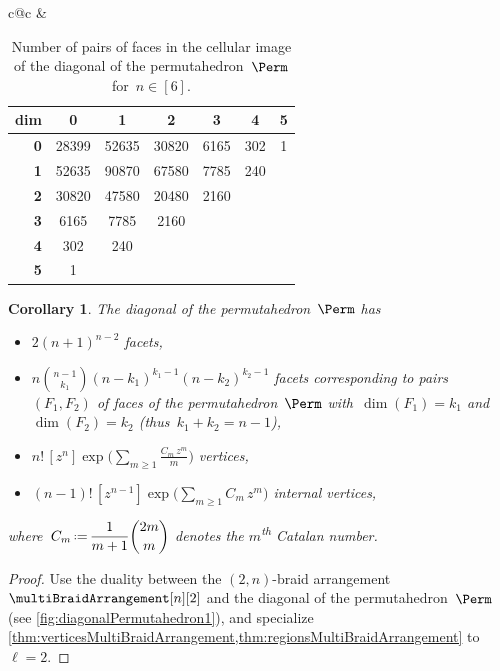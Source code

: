 \documentclass{amsart}
\newtheorem{corollary}[theorem]{Corollary}
\theoremstyle{definition}
\newcommand{\eqdef}{\mbox{\,\raisebox{0.2ex}{\scriptsize\ensuremath{\mathrm:}}\ensuremath{=}\,}} %
\newcommand{\ordinal}{\textsuperscript{th}} %
\begin{document}
\begin{table}
{\begin{tabular}{c@{\quad}c}
			&
			\begin{tabular}[t]{r|cccccc}
				\textbf{dim} & \textbf{0} & \textbf{1} & \textbf{2} & \textbf{3} & \textbf{4} & \textbf{5} \\
				\hline
				\textbf{0} & 28399 & 52635 & 30820 & 6165 & 302 & 1 \\
				\textbf{1} & 52635 & 90870 & 67580 & 7785 & 240 & \\
				\textbf{2} & 30820 & 47580 & 20480 & 2160 & & \\
				\textbf{3} & 6165 & 7785 & 2160 & && \\
				\textbf{4} & 302 & 240 & & &&\\
				\textbf{5} & 1 & & & &&
			\end{tabular}
		\end{tabular}
	}
	\caption{Number of pairs of faces in the cellular image of the diagonal of the permutahedron~$\Perm$ for~$n \in [6]$.}
	\label{table:enumerationDiagonalPermutahedra2}
\end{table}

\begin{corollary}
\label{coro:enumerationDiagonalPermutahedra}
The diagonal of the permutahedron~$\Perm$ has 
\begin{itemize}
\item $2 (n + 1)^{n-2}$ facets,
\item $n \binom{n-1}{k_1} (n-k_1)^{k_1-1} (n-k_2)^{k_2-1}$ facets corresponding to pairs~$(F_1, F_2)$ of faces of the permutahedron~$\Perm$ with~$\dim(F_1) = k_1$ and~$\dim(F_2) = k_2$ (thus~$k_1 + k_2 = n-1$),
\item $\displaystyle n! \, [z^n] \exp \bigg( \sum_{m \ge 1} \frac{C_m \, z^m}{m} \bigg)$ vertices,
\item $\displaystyle (n-1)! \, [z^{n-1}] \exp \bigg( \sum_{m \ge 1} C_m \, z^m \bigg)$ internal vertices,
\end{itemize}
where~$\displaystyle C_m \eqdef \frac{1}{m+1} \binom{2m}{m}$ denotes the $m$\ordinal{} Catalan number.
\end{corollary}

\begin{proof}
Use the duality between the $(2,n)$-braid arrangement~$\multiBraidArrangement[n][2]$ and the diagonal of the permutahedron~$\Perm$ (see \cref{fig:diagonalPermutahedron1}), and specialize \cref{thm:verticesMultiBraidArrangement,thm:regionsMultiBraidArrangement} to~$\ell = 2$.
\end{proof}
\end{document}
